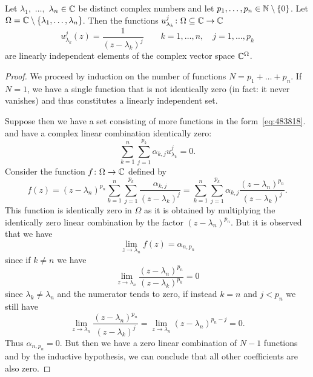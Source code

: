 \begin{lemma}
\label{lemma:72995}
Let $\lambda_1,$ $\dots,$ $\lambda_n \in {\mathbb C}$ be distinct complex numbers
and let $p_1,\dots,p_n \in {\mathbb N}\setminus{\left\{ 0 \right\}}$.
Let $\Omega = {\mathbb C} \setminus {\left\{ \lambda_1, \dots, \lambda_n \right\}}$.
Then the functions
$u_{\lambda_k}^{j}\colon \Omega\subseteq {\mathbb C} \to {\mathbb C}$
\begin{equation}
\label{eq:483818}
  u_{\lambda_k}^{j}(z) = \frac{1}{(z-\lambda_k)^{j}}
  \qquad k=1,\dots,n, \quad j=1,\dots, p_k
\end{equation}
are linearly independent elements of the complex vector space
${\mathbb C}^\Omega$.
\end{lemma}
%
\begin{proof}
We proceed by induction on the number of functions
$N=p_1+ \dots + p_n$.
If $N=1$, we have a single function that is not identically
zero (in fact: it never vanishes)
and thus constitutes a linearly independent set.

Suppose then we have a set consisting of more functions
in the form~\eqref{eq:483818}.
and have
a complex linear combination identically zero:
\[
\sum_{k=1}^n \sum_{j=1}^{p_k} \alpha_{k,j} u_{\lambda_k}^j = 0.
\]
Consider the function $f\colon \Omega \to {\mathbb C}$
defined by
\begin{equation}
\label{eq:567384}
  f(z)
    = (z-\lambda_n)^{p_n}\sum_{k=1}^n \sum_{j=1}^{p_k}
  \frac{\alpha_{k,j}}{(z-\lambda_k)^{j}}
    = \sum_{k=1}^n \sum_{j=1}^{p_k}
  \alpha_{k,j}\frac{(z-\lambda_n)^{p_n}}{(z-\lambda_k)^{j}}.
\end{equation}
This function is identically zero
in $\Omega$ as it is obtained by multiplying the identically
zero linear combination by the factor $(z-\lambda_n)^{p_n}$.
But it is observed that we have
\[
  \lim_{z\to \lambda_n} f(z) = \alpha_{n,p_n}
\]
since if $k\neq n$ we have
\[
\lim_{z\to \lambda_n}\frac{(z-\lambda_n)^{p_n}}{(z-\lambda_k)^{p_k}} = 0
\]
since $\lambda_k\neq \lambda_n$ and the numerator
tends to zero, if instead $k=n$ and $j<p_n$ we still have
\[
\lim_{z\to \lambda_n}\frac{(z-\lambda_n)^{p_n}}{(z-\lambda_k)^{j}}
= \lim_{z\to \lambda_n}(z-\lambda_n)^{p_n-j} = 0.
\]
Thus $\alpha_{n,p_n}=0$.
But then we have a zero linear combination of $N-1$
functions and by the inductive hypothesis, we can conclude
that all other coefficients are also zero.
\end{proof}

